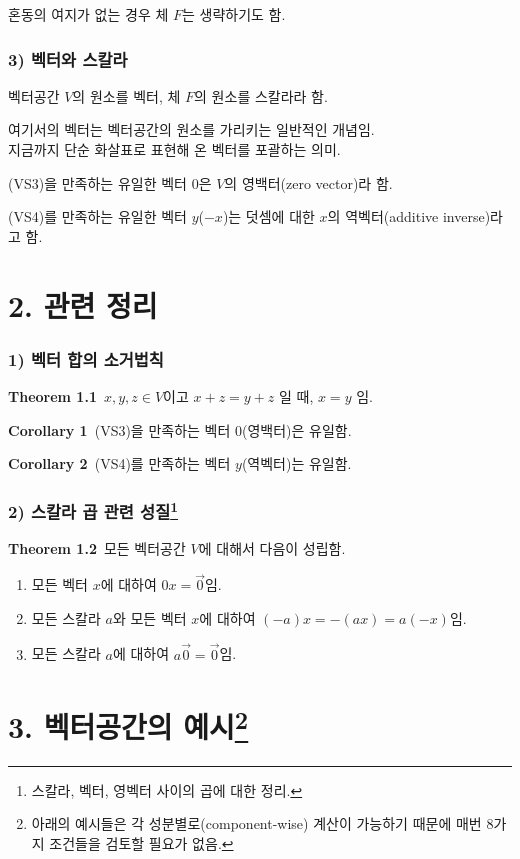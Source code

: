 혼동의 여지가 없는 경우 체 $F$는 생략하기도 함.

\subsubsection*{3) 벡터와 스칼라}
벡터공간 $V$의 원소를 벡터, 체 $F$의 원소를 스칼라라 함.

여기서의 벡터는 벡터공간의 원소를 가리키는 일반적인 개념임.\\
지금까지 단순 화살표로 표현해 온 벡터를 포괄하는 의미.

(VS3)을 만족하는 유일한 벡터 $0$은 $V$의 영백터(zero vector)라 함.

(VS4)를 만족하는 유일한 벡터 $y$($-x$)는 덧셈에 대한 $x$의 역벡터(additive inverse)라고 함.


\newpage


\section*{2. 관련 정리}
\subsubsection*{1) 벡터 합의 소거법칙}
\textbf{Theorem 1.1}\, $x,y,z \in V$이고 $x+z=y+z$ 일 때, $x = y$ 임.

\textbf{Corollary 1}\, (VS3)을 만족하는 벡터 $0$(영백터)은 유일함.

\textbf{Corollary 2}\, (VS4)를 만족하는 벡터 $y$(역벡터)는 유일함.

\subsubsection*{2) 스칼라 곱 관련 성질\footnote{스칼라, 벡터, 영벡터 사이의 곱에 대한 정리.}}

\textbf{Theorem 1.2}\, 모든 벡터공간 $V$에 대해서 다음이 성립함.

\begin{enumerate}
    \item 모든 벡터 $x$에 대하여 $0x= \vec{0}$임.
    \item 모든 스칼라 $a$와 모든 벡터 $x$에 대하여 $(-a)x=-(ax)=a(-x)$임.
    \item 모든 스칼라 $a$에 대하여 $a \vec{0} = \vec{0}$임.\\
\end{enumerate}



\section*{3. 벡터공간의 예시\footnote{아래의 예시들은 각 성분별로(component-wise) 계산이 가능하기 때문에 매번 8가지 조건들을 검토할 필요가 없음.}}
